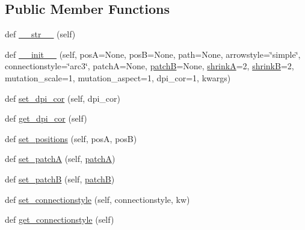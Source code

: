 \subsection*{Public Member Functions}
\begin{DoxyCompactItemize}
\item 
def \hyperlink{classmatplotlib_1_1patches_1_1FancyArrowPatch_a6cb9f0b11b2eed420c928fa9353ae219}{\+\_\+\+\_\+str\+\_\+\+\_\+} (self)
\item 
def \hyperlink{classmatplotlib_1_1patches_1_1FancyArrowPatch_a88ac40d08aa4dfd3f50e747d8036cb14}{\+\_\+\+\_\+init\+\_\+\+\_\+} (self, posA=None, posB=None, path=None, arrowstyle=\char`\"{}simple\char`\"{}, connectionstyle=\char`\"{}arc3\char`\"{}, patchA=None, \hyperlink{classmatplotlib_1_1patches_1_1FancyArrowPatch_a9cc415418cb63ac92789d825f6807e1e}{patchB}=None, \hyperlink{classmatplotlib_1_1patches_1_1FancyArrowPatch_adfb328e84a682e61d16ab31c90bb0290}{shrinkA}=2, \hyperlink{classmatplotlib_1_1patches_1_1FancyArrowPatch_a54e1943557952ab7abc9be952291556e}{shrinkB}=2, mutation\+\_\+scale=1, mutation\+\_\+aspect=1, dpi\+\_\+cor=1, kwargs)
\item 
def \hyperlink{classmatplotlib_1_1patches_1_1FancyArrowPatch_a8ef7fd95491988643492bbf37accf87e}{set\+\_\+dpi\+\_\+cor} (self, dpi\+\_\+cor)
\item 
def \hyperlink{classmatplotlib_1_1patches_1_1FancyArrowPatch_abac290d0876627b7010845b63caf65e3}{get\+\_\+dpi\+\_\+cor} (self)
\item 
def \hyperlink{classmatplotlib_1_1patches_1_1FancyArrowPatch_a63cbfa92fcd4fab4df769e4ee70c9f6a}{set\+\_\+positions} (self, posA, posB)
\item 
def \hyperlink{classmatplotlib_1_1patches_1_1FancyArrowPatch_a130bd5d1584e8d547a9068aa35b693a3}{set\+\_\+patchA} (self, \hyperlink{classmatplotlib_1_1patches_1_1FancyArrowPatch_a0444e1655457096a5aa201177e789f88}{patchA})
\item 
def \hyperlink{classmatplotlib_1_1patches_1_1FancyArrowPatch_a6d55e01a789938f6723e24dcbe124895}{set\+\_\+patchB} (self, \hyperlink{classmatplotlib_1_1patches_1_1FancyArrowPatch_a9cc415418cb63ac92789d825f6807e1e}{patchB})
\item 
def \hyperlink{classmatplotlib_1_1patches_1_1FancyArrowPatch_ad8bba70a6285d1b93ac062804b807a9e}{set\+\_\+connectionstyle} (self, connectionstyle, kw)
\item 
def \hyperlink{classmatplotlib_1_1patches_1_1FancyArrowPatch_aff5b6b4b4dbb9a1a037cc5d4e8e73158}{get\+\_\+connectionstyle} (self)
\item 

\end{DoxyCompactItemize}
